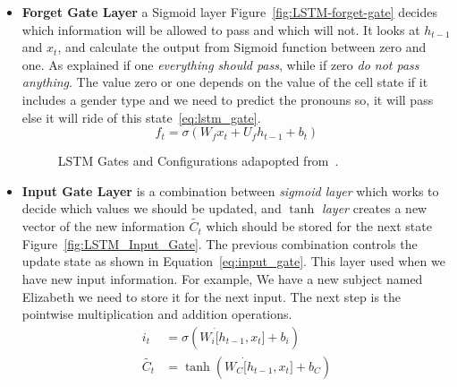 \begin{itemize}
  
\item \textbf{Forget Gate Layer} a Sigmoid layer Figure~\ref{fig:LSTM-forget-gate} decides which information will be allowed to pass and which will not. It looks at $h_{t-1}$ and $x_t$, and calculate the output from Sigmoid function between zero and one. As explained if one \textit{everything should pass}, while if zero \textit{do not pass anything}. The value zero or one depends on the value of the cell state if it includes a gender type and we need to predict the pronouns so, it will pass else it will ride of this state~\eqref{eq:lstm_gate}.%
\begin{equation}\label{eq:lstm_gate}
f_t  = \sigma(W_f  x_t + U_f h_{t-1} + b_t)
\end{equation}%
\begin{figure}[!t]
  \centering
  \caption{LSTM Gates and Configurations adapopted from~\cite{colah}.}
\end{figure}%

\item \textbf{Input Gate Layer} is a combination between \textit{sigmoid layer} which works to decide which values we should be updated, and \textit{$\tanh$ layer} creates a new vector of the new information $\tilde{C_t}$ which should be stored for the next state Figure~\ref{fig:LSTM_Input_Gate}. The previous combination controls the update state as shown in Equation~\eqref{eq:input_gate}. This layer used when we have new input information. For example, We have a new subject named Elizabeth we need to store it for the next input. The next step is the pointwise multiplication and addition operations.%
\begin{subequations}\label{eq:input_gate}
\begin{align}
  i_t  &= \sigma(W_i \dot[h_{t-1},x_t] + b_i)\\
\widetilde{C_t} &= \tanh(W_C\dot [h_{t-1},x_t]+ b_C)
\end{align}
\end{subequations}


\end{itemize}
